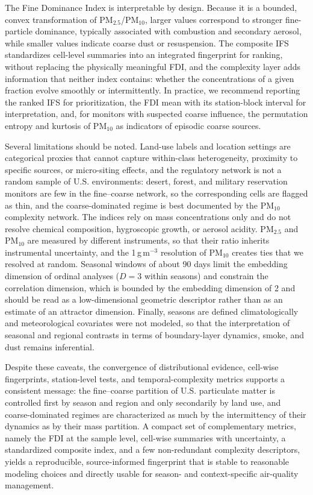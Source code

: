 \documentclass[a4paper,fleqn]{cas-sc}
\begin{document}
The Fine Dominance Index is interpretable by design. Because it is a bounded, convex transformation of PM$_{2.5}$/PM$_{10}$, larger values correspond to stronger fine-particle dominance, typically associated with combustion and secondary aerosol, while smaller values indicate coarse dust or resuspension. The composite IFS standardizes cell-level summaries into an integrated fingerprint for ranking, without replacing the physically meaningful FDI, and the complexity layer adds information that neither index contains: whether the concentrations of a given fraction evolve smoothly or intermittently. In practice, we recommend reporting the ranked IFS for prioritization, the FDI mean with its station-block interval for interpretation, and, for monitors with suspected coarse influence, the permutation entropy and kurtosis of PM$_{10}$ as indicators of episodic coarse sources.

Several limitations should be noted. Land-use labels and location settings are categorical proxies that cannot capture within-class heterogeneity, proximity to specific sources, or micro-siting effects, and the regulatory network is not a random sample of U.S. environments: desert, forest, and military reservation monitors are few in the fine--coarse network, so the corresponding cells are flagged as thin, and the coarse-dominated regime is best documented by the PM$_{10}$ complexity network. The indices rely on mass concentrations only and do not resolve chemical composition, hygroscopic growth, or aerosol acidity. PM$_{2.5}$ and PM$_{10}$ are measured by different instruments, so that their ratio inherits instrumental uncertainty, and the 1\,\textmu g\,m$^{-3}$ resolution of PM$_{10}$ creates ties that we resolved at random. Seasonal windows of about 90 days limit the embedding dimension of ordinal analyses ($D=3$ within seasons) and constrain the correlation dimension, which is bounded by the embedding dimension of 2 and should be read as a low-dimensional geometric descriptor rather than as an estimate of an attractor dimension. Finally, seasons are defined climatologically and meteorological covariates were not modeled, so that the interpretation of seasonal and regional contrasts in terms of boundary-layer dynamics, smoke, and dust remains inferential.

Despite these caveats, the convergence of distributional evidence, cell-wise fingerprints, station-level tests, and temporal-complexity metrics supports a consistent message: the fine--coarse partition of U.S. particulate matter is controlled first by season and region and only secondarily by land use, and coarse-dominated regimes are characterized as much by the intermittency of their dynamics as by their mass partition. A compact set of complementary metrics, namely the FDI at the sample level, cell-wise summaries with uncertainty, a standardized composite index, and a few non-redundant complexity descriptors, yields a reproducible, source-informed fingerprint that is stable to reasonable modeling choices and directly usable for season- and context-specific air-quality management.
\end{document}
